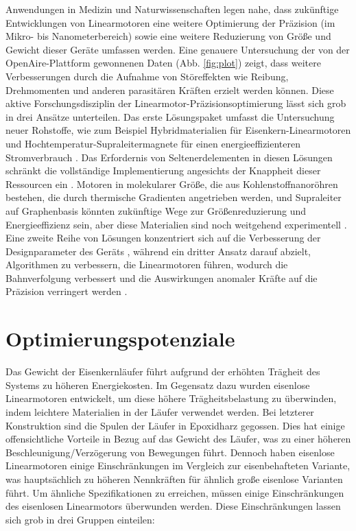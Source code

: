\documentclass[
  oneside]{book}
\begin{document}
Anwendungen in Medizin und Naturwissenschaften legen nahe, dass zukünftige Entwicklungen von Linearmotoren eine weitere Optimierung der Präzision (im Mikro- bis Nanometerbereich) sowie eine weitere Reduzierung von Größe und Gewicht dieser Geräte umfassen werden. Eine genauere Untersuchung der von der OpenAire-Plattform gewonnenen Daten (Abb. \ref{fig:plot}) zeigt, dass weitere Verbesserungen durch die Aufnahme von Störeffekten wie Reibung, Drehmomenten und anderen parasitären Kräften erzielt werden können. Diese aktive Forschungsdisziplin der Linearmotor-Präzisionsoptimierung lässt sich grob in drei Ansätze unterteilen. Das erste Lösungspaket umfasst die Untersuchung neuer Rohstoffe, wie zum Beispiel Hybridmaterialien für Eisenkern-Linearmotoren \citep{liu2021} und Hochtemperatur-Supraleitermagnete für einen energieeffizienteren Stromverbrauch \citep{zhang2016, palka2021}. Das Erfordernis von Seltenerdelementen in diesen Lösungen schränkt die vollständige Implementierung angesichts der Knappheit dieser Ressourcen ein \citep{deboer2013}. Motoren in molekularer Größe, die aus Kohlenstoffnanoröhren bestehen, die durch thermische Gradienten angetrieben werden, und Supraleiter auf Graphenbasis könnten zukünftige Wege zur Größenreduzierung und Energieeffizienz sein, aber diese Materialien sind noch weitgehend experimentell \citep{zambrano2009, cao2018}. Eine zweite Reihe von Lösungen konzentriert sich auf die Verbesserung der Designparameter des Geräts \citep{kuang2017, kramer2021}, während ein dritter Ansatz darauf abzielt, Algorithmen zu verbessern, die Linearmotoren führen, wodurch die Bahnverfolgung verbessert und die Auswirkungen anomaler Kräfte auf die Präzision verringert werden \citep{nguyen2016, mo2017, yunbo2018, chen2020, yao2021}.

\hypertarget{optim}{%
\section{Optimierungspotenziale}\label{optim}}

Das Gewicht der Eisenkernläufer führt aufgrund der erhöhten Trägheit des Systems zu höheren Energiekosten. Im Gegensatz dazu wurden eisenlose Linearmotoren entwickelt, um diese höhere Trägheitsbelastung zu überwinden, indem leichtere Materialien in der Läufer verwendet werden. Bei letzterer Konstruktion sind die Spulen der Läufer in Epoxidharz gegossen. Dies hat einige offensichtliche Vorteile in Bezug auf das Gewicht des Läufer, was zu einer höheren Beschleunigung/Verzögerung von Bewegungen führt. Dennoch haben eisenlose Linearmotoren einige Einschränkungen im Vergleich zur eisenbehafteten Variante, was hauptsächlich zu höheren Nennkräften für ähnlich große eisenlose Varianten führt. Um ähnliche Spezifikationen zu erreichen, müssen einige Einschränkungen des eisenlosen Linearmotors überwunden werden. Diese Einschränkungen lassen sich grob in drei Gruppen einteilen:
\end{document}
